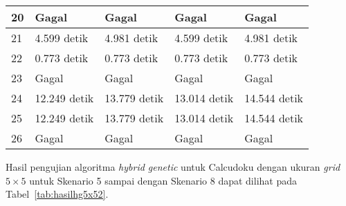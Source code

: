 \begin{table}
\begin{tabular}{| l | l | l | l | l |}
\hline
20 & Gagal & Gagal & Gagal & Gagal \\
\hline
21 & 4.599 detik & 4.981 detik & 4.599 detik & 4.981 detik \\
\hline
22 & 0.773 detik & 0.773 detik & 0.773 detik & 0.773 detik \\
\hline
23 & Gagal & Gagal & Gagal & Gagal \\
\hline
24 & 12.249 detik & 13.779 detik & 13.014 detik & 14.544 detik \\
\hline
25 & 12.249 detik & 13.779 detik & 13.014 detik & 14.544 detik \\
\hline
26 & Gagal & Gagal & Gagal & Gagal \\
\hline
\end{tabular}
\label{tab:hasilhg5x51}
\end{table}

Hasil pengujian algoritma \textit{hybrid genetic} untuk Calcudoku dengan ukuran \textit{grid} \begin{math}5 \times 5\end{math} untuk Skenario 5 sampai dengan Skenario 8 dapat dilihat pada Tabel~\ref{tab:hasilhg5x52}.

